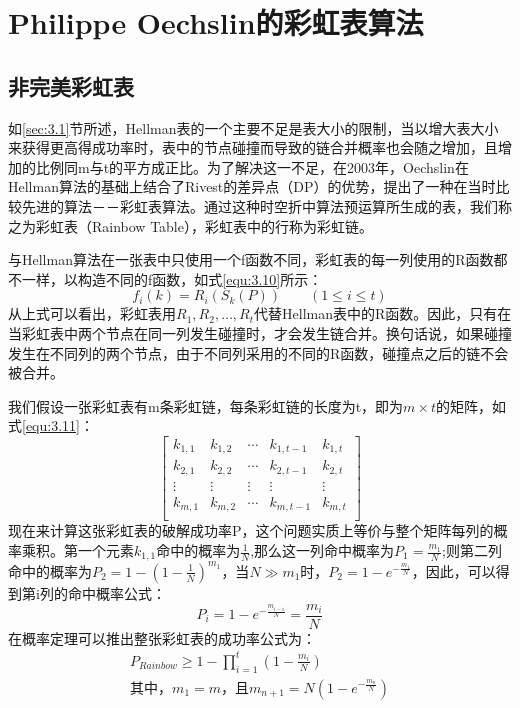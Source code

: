 \section{Philippe Oechslin的彩虹表算法}
\label{sec:3.3}
	\subsection{非完美彩虹表}
如\ref{sec:3.1}节所述，Hellman表的一个主要不足是表大小的限制，当以增大表大小来获得更高得成功率时，表中的节点碰撞而导致的链合并概率也会随之增加，且增加的比例同m与t的平方成正比。为了解决这一不足，在2003年，Oechslin在Hellman算法的基础上结合了Rivest的差异点（DP）的优势，提出了一种在当时比较先进的算法－－彩虹表算法\cite{PO}。通过这种时空折中算法预运算所生成的表，我们称之为彩虹表（Rainbow Table），彩虹表中的行称为彩虹链。

与Hellman算法在一张表中只使用一个f函数不同，彩虹表的每一列使用的R函数都不一样，以构造不同的f函数，如式\eqref{equ:3.10}所示：
\begin{equation}
\label{equ:3.10}
f_i(k)=R_i(S_k(P)) \quad \quad  (1\leq i \leq t) 
\end{equation}
从上式可以看出，彩虹表用$R_1,R_2,\ldots ,R_t$代替Hellman表中的R函数。因此，只有在当彩虹表中两个节点在同一列发生碰撞时，才会发生链合并。换句话说，如果碰撞发生在不同列的两个节点，由于不同列采用的不同的R函数，碰撞点之后的链不会被合并。

我们假设一张彩虹表有m条彩虹链，每条彩虹链的长度为t，即为$m\times t$的矩阵，如式\eqref{equ:3.11}：
\begin{equation}
\label{equ:3.11}
\begin{bmatrix}
k_{1,1} & k_{1,2} & \cdots & k_{1,t-1} & k_{1,t} \\
k_{2,1} & k_{2,2} & \cdots & k_{2,t-1} & k_{2,t} \\
\vdots & \vdots & \vdots & \vdots & \vdots \\
k_{m,1} & k_{m,2} & \cdots & k_{m,t-1} & k_{m,t} \\
\end{bmatrix}
\end{equation}
现在来计算这张彩虹表的破解成功率P，这个问题实质上等价与整个矩阵每列的概率乘积。第一个元素$k_{1,1}$命中的概率为$\frac{1}{N}$,那么这一列命中概率为$P_1=\frac{m_{1}}{N}$;则第二列命中的概率为$P_2=1-(1-\frac{1}{N})^{m_1}$，当$N\gg m_{1}$时，$P_2=1-e^{-\tfrac{m_1}N{}}$，因此，可以得到第i列的命中概率公式：
\begin{equation}
P_i=1-e^{-\tfrac{m_{i-1}}{N}}=\frac{m_i}{N}
\end{equation}
在概率定理可以推出整张彩虹表的成功率公式为：
\begin{eqnarray}
\label{equ:3.12}
P_{Rainbow} \ge 1-\prod^{t}_{i=1}\left(1-\frac{m_{i}}{N}\right) \nonumber\\
\text{其中，} m_{1}=m \text{，且} m_{n+1} = N\left(1-e^{-\tfrac{m_{n}}{N}}\right)
\end{eqnarray}

